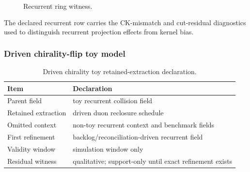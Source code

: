 \begin{figure}[H]
\centering
{}
\caption{Recurrent ring witness.}
\label{fig:recurrent-ring-witness}
\end{figure}

The declared recurrent row carries the CK-mismatch and cut-residual diagnostics used to distinguish recurrent projection effects from kernel bias.


\subsubsection{Driven chirality-flip toy model}
\label{man:driven-chirality-flip-toy}

\begin{table}[H]
\centering
\caption{Driven chirality toy retained-extraction declaration.}
\label{tab:chirality-toy-retention}
\begin{threeparttable}
\begin{tabularx}{\linewidth}{@{}lX@{}}
\toprule
Item & Declaration \\
\midrule
Parent field & toy recurrent collision field \\
Retained extraction & driven duon reclosure schedule \\
Omitted context & non-toy recurrent context and benchmark fields \\
First refinement & backlog/reconciliation-driven recurrent field \\
Validity window & simulation window only \\
Residual witness & qualitative; support-only until exact refinement exists \\
\bottomrule
\end{tabularx}
\end{threeparttable}
\end{table}

